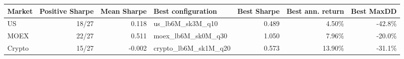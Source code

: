 \footnotesize
\setlength{\tabcolsep}{5pt}
\begin{tabular}{lrrlrrr}
\toprule
Market & Positive Sharpe & Mean Sharpe & Best configuration & Best Sharpe & Best ann. return & Best MaxDD \\
\midrule
US & 18/27 & 0.118 & us\_lb6M\_sk3M\_q10 & 0.489 & 4.50\% & -42.8\% \\
MOEX & 22/27 & 0.511 & moex\_lb6M\_sk0M\_q30 & 1.050 & 7.96\% & -20.0\% \\
Crypto & 15/27 & -0.002 & crypto\_lb6M\_sk1M\_q20 & 0.573 & 13.90\% & -31.1\% \\
\bottomrule
\end{tabular}
